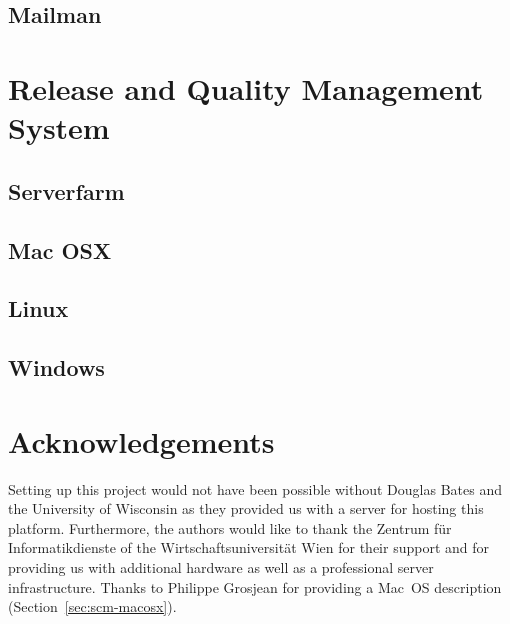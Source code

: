 \documentclass[a4paper]{article}
\begin{document}
\subsection{Mailman}

\section{Release and Quality Management System}
\label{sec:release_and_QM}

\subsection{Serverfarm}
\subsection{Mac OSX}
\subsection{Linux}
\subsection{Windows}


\section{Acknowledgements}

Setting up this project would not have been possible without Douglas
Bates and the University of Wisconsin as they provided us with a
server for hosting this platform. Furthermore, 
the authors would like to thank the Zentrum f\"ur Informatikdienste  
of the Wirtschaftsuniversit\"at Wien for
their support and for providing us with additional hardware as well as a
professional server infrastructure. 
Thanks to Philippe Grosjean for
providing a Mac~OS description (Section~\ref{sec:scm-macosx}).



\end{document}

